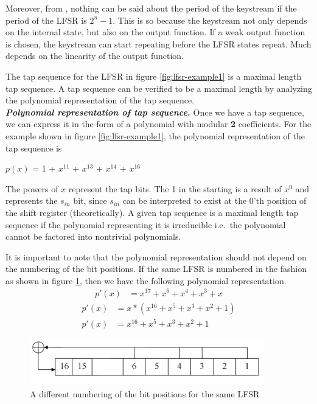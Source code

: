 Moreover, from \cite{erik-discussions}, nothing can be said about the period of the keystream if the period of the LFSR is $2^n-1$. This is so because the keystream not only depends on the internal state, but also on the output function. If a weak output function is chosen, the keystream can start repeating before the LFSR states repeat. Much depends on the linearity of the output function.

The tap sequence for the LFSR in figure \ref{fig:lfsr-example1} is a maximal length tap sequence. A tap sequence can be verified to be a maximal length by analyzing the polynomial representation of the tap sequence.\\

\noindent \textit{\textbf{Polynomial representation of tap sequence.}} Once we have a tap sequence, we can express it in the form of a polynomial with modular \textbf{2} coefficients. For the example shown in figure \ref{fig:lfsr-example1}, the polynomial representation of the tap sequence is

\begin{center}
$p(x)$ =  1 + $x^{11}$ + $x^{13}$ + $x^{14}$ + $x^{16}$
\end{center}

The powers of $x$ represent the tap bits. The 1 in the starting is a result of $x^0$ and represents the $s_{in}$ bit, since $s_{in}$ can be interpreted to exist at the 0'th position of the shift register (theoretically). A given tap sequence is a maximal length tap sequence if the polynomial representing it is irreducible i.e.~the polynomial cannot be factored into nontrivial polynomials.

It is important to note that the polynomial representation should not depend on the numbering of the bit positions. If the same LFSR is numbered in the fashion as shown in figure \ref{fig:lfsr-example2}, then we have the following polynomial representation.
\begin{align*}
p'(x) &= x^{17} + x^{6} + x^{4} + x^{3} + x
\end{align*}
\begin{align}
\label{eq:poly-1} p'(x) &= x*(x^{16} + x^{5} + x^{3} + x^{2} + 1)\\
\label{eq:poly-2} p'(x) &= x^{16} + x^{5} + x^{3} + x^{2} + 1
\end{align}

\begin{figure}[ht!]
	\centering
		\includegraphics[width=4in]{./figures/lfsr-example-reverse.PNG}
	\caption{A different numbering of the bit positions for the same LFSR}	
	\label{fig:lfsr-example2}
\end{figure}

